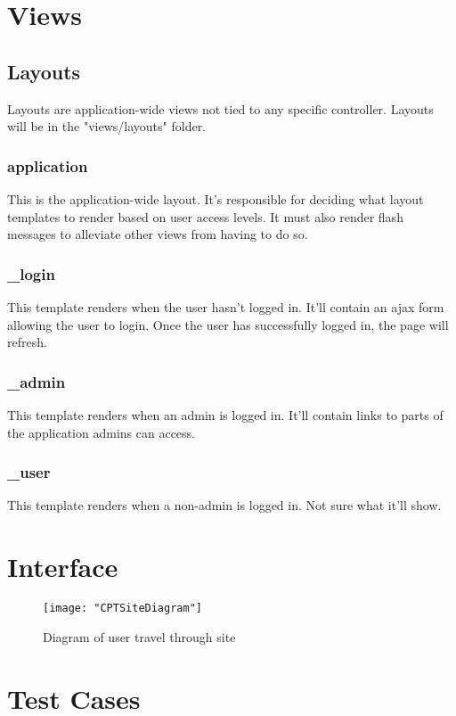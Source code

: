 \documentclass[12pt]{article}
\begin{document}
\section{Views}
\subsection{Layouts}
Layouts are application-wide views not tied to any specific controller. Layouts will be in the "views/layouts" folder.
\subsubsection{application}
This is the application-wide layout. It's responsible for deciding what layout templates to render based on user access levels.
It must also render flash messages to alleviate other views from having to do so.
\subsubsection{\_login}
This template renders when the user hasn't logged in. It'll contain an ajax form allowing the user to login.
Once the user has successfully logged in, the page will refresh.
\subsubsection{\_admin}
This template renders when an admin is logged in. It'll contain links to parts of the application admins can access.
\subsubsection{\_user}
This template renders when a non-admin is logged in. Not sure what it'll show.


\section{Interface}
\begin{figure}[H]
\begin{center}
\texttt{[image: "CPTSiteDiagram"]}
\caption{Diagram of user  travel through site}
\label{fig:dia}
\end{center}
\end{figure}
\section{Test Cases}
\end{document}
